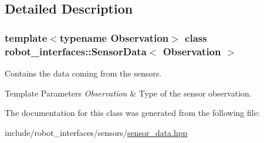 \subsection{Detailed Description}
\subsubsection*{template$<$typename Observation$>$\newline
class robot\+\_\+interfaces\+::\+Sensor\+Data$<$ Observation $>$}

Contains the data coming from the sensors. 


\begin{DoxyTemplParams}{Template Parameters}
{\em Observation} & Type of the sensor observation. \\
\hline
\end{DoxyTemplParams}


The documentation for this class was generated from the following file\+:\begin{DoxyCompactItemize}
\item 
include/robot\+\_\+interfaces/sensors/\hyperlink{sensor__data_8hpp}{sensor\+\_\+data.\+hpp}\end{DoxyCompactItemize}
